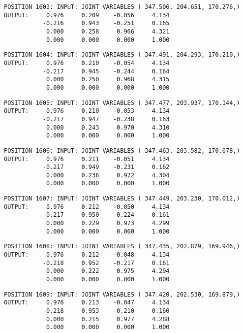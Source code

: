 \begin{verbatim}
POSITION 1603: INPUT: JOINT VARIABLES ( 347.506, 204.651, 170.276,)
OUTPUT:     0.976     0.209    -0.056     4.134
           -0.216     0.943    -0.251     0.165
            0.000     0.258     0.966     4.321
            0.000     0.000     0.000     1.000
\end{verbatim} \pagebreak[1]\begin{verbatim}
POSITION 1604: INPUT: JOINT VARIABLES ( 347.491, 204.293, 170.210,)
OUTPUT:     0.976     0.210    -0.054     4.134
           -0.217     0.945    -0.244     0.164
            0.000     0.250     0.968     4.315
            0.000     0.000     0.000     1.000
\end{verbatim} \pagebreak[1]\begin{verbatim}
POSITION 1605: INPUT: JOINT VARIABLES ( 347.477, 203.937, 170.144,)
OUTPUT:     0.976     0.210    -0.053     4.134
           -0.217     0.947    -0.238     0.163
            0.000     0.243     0.970     4.310
            0.000     0.000     0.000     1.000
\end{verbatim} \pagebreak[1]\begin{verbatim}
POSITION 1606: INPUT: JOINT VARIABLES ( 347.463, 203.582, 170.078,)
OUTPUT:     0.976     0.211    -0.051     4.134
           -0.217     0.949    -0.231     0.162
            0.000     0.236     0.972     4.304
            0.000     0.000     0.000     1.000
\end{verbatim} \pagebreak[1]\begin{verbatim}
POSITION 1607: INPUT: JOINT VARIABLES ( 347.449, 203.230, 170.012,)
OUTPUT:     0.976     0.212    -0.050     4.134
           -0.217     0.950    -0.224     0.161
            0.000     0.229     0.973     4.299
            0.000     0.000     0.000     1.000
\end{verbatim} \pagebreak[1]\begin{verbatim}
POSITION 1608: INPUT: JOINT VARIABLES ( 347.435, 202.879, 169.946,)
OUTPUT:     0.976     0.212    -0.048     4.134
           -0.218     0.952    -0.217     0.161
            0.000     0.222     0.975     4.294
            0.000     0.000     0.000     1.000
\end{verbatim} \pagebreak[1]\begin{verbatim}
POSITION 1609: INPUT: JOINT VARIABLES ( 347.420, 202.530, 169.879,)
OUTPUT:     0.976     0.213    -0.047     4.134
           -0.218     0.953    -0.210     0.160
            0.000     0.215     0.977     4.288
            0.000     0.000     0.000     1.000
\end{verbatim} \pagebreak[1]\begin{verbatim}

\end{verbatim}
